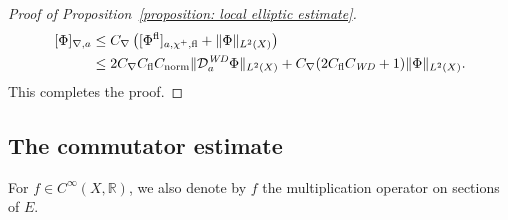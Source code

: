 \documentclass[a4paper,oneside,12pt]{amsart}
\theoremstyle{plain}
\theoremstyle{definition}
\theoremstyle{remark}
\newcommand{\R}{\mathbb{R}}
\DeclarePairedDelimiter{\norm}{\lVert}{\rVert}
\DeclarePairedDelimiter{\seminorm}{\lbrack}{\rbrack}
\newcommand{\Ltwonorm}[2][L^2]{\norm{#2}_{#1}}
\newcommand{\mesoscopicdifferenceseminorm}[2][a]{\seminorm{#2}_{\nabla,#1}}
\newcommand{\flatmesoscopicdifferenceseminorm}[3][a]{\seminorm{#3}_{#1,#2,\mathrm{fl}}}
\newcommand{\mesoscopicWilsonDiracoperator}[1][a]{\mathcal{D}_{#1}^{\mathit{WD}}}
\newcommand{\cutoffupper}{\chi^+}
\newcommand{\flatmodel}[1]{#1^{\mathrm{fl}}}
\newcommand{\constantflat}{C_{\mathrm{fl}}}
\newcommand{\constantLtwonorm}{C_{\mathrm{norm}}}
\newcommand{\constantnabla}{C_{\nabla}}
\newcommand{\constantWD}{C_{\mathit{WD}}}
\begin{document}
\begin{proof}[Proof of Proposition~\ref{proposition: local elliptic estimate}]
  \begin{equation}
    \begin{aligned}
    \mesoscopicdifferenceseminorm{\Phi} \le{}& \constantnabla \left( \flatmesoscopicdifferenceseminorm{\cutoffupper}{\flatmodel{\Phi}} + \Ltwonorm[L^2(X)]{\Phi} \right) \\
    \le{}& 2 \constantnabla \constantflat \constantLtwonorm \Ltwonorm[L^2(X)]{\mesoscopicWilsonDiracoperator \Phi} + \constantnabla(2\constantflat \constantWD + 1) \Ltwonorm[L^2(X)]{\Phi}.
    \end{aligned}
  \end{equation}
  This completes the proof.
\end{proof}

\subsection{The commutator estimate}

For $f \in C^{\infty}(X,\R)$, we also denote by $f$ the multiplication operator on sections of $E$.
\end{document}
